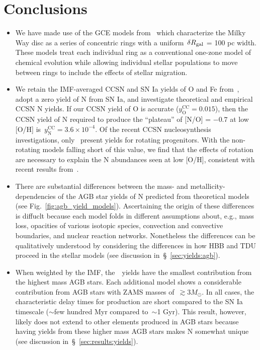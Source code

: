\documentclass[ms.tex]{subfiles}
\begin{document}
 

\section{Conclusions} 
\label{sec:conclusions} 

\begin{itemize} 
	\item We have made use of the GCE models from~\citet{Johnson2021} which 
	characterize the Milky Way disc as a series of concentric rings with a 
	uniform~$\delta R_\text{gal}$ = 100 pc width. 
	These models treat each individual ring as a conventional one-zone model 
	of chemical evolution while allowing individual stellar populations to move 
	between rings to include the effects of stellar migration. 

	\item We retain the IMF-averaged CCSN and SN Ia yields of O and Fe 
	from~\citet{Johnson2021}, adopt a zero yield of N from SN Ia, and 
	investigate theoretical and empirical CCSN N yields. 
	If our CCSN yield of O is accurate ($y_\text{O}^\text{CC} = 0.015$), then 
	the CCSN yield of N required to produce the ``plateau'' of [N/O] = $-0.7$ 
	at low [O/H] is~$y_\text{N}^\text{CC} = 3.6\times10^{-4}$. 
	Of the recent CCSN nucleosynthesis investigations, only~\citet{Limongi2018} 
	present yields for rotating progenitors. 
	With the non-rotating models falling short of this value, we find that the 
	effects of rotation are necessary to explain the N abundances seen at low 
	[O/H], consistent with recent results from~\citet{Grisoni2021}. 

	\item There are substantial differences between the mass- and
	metallicity-dependencies of the AGB star yields of N predicted from
	theoretical models (see Fig.~\ref{fig:agb_yield_models}).
	Ascertaining the origin of these differences is diffuclt because each
	model folds in different assumptions about, e.g., mass loss, opacities of
	various isotopic species, convection and convective boundaries, and nuclear
	reaction networks.
	Nonetheless the differences can be qualitatively understood by considering
	the differences in how HBB and TDU proceed in the stellar models (see
	discussion in~\S~\ref{sec:yields:agb}).

	\item When weighted by the IMF, the~\cristallo~yields have the smallest
	contribution from the highest mass AGB stars.
	Each additional model shows a considerable contribution from AGB stars
	with ZAMS masses of~$\gtrsim 3 M_\odot$.
	In all cases, the characteristic delay times for production are short
	compared to the SN Ia timescale ($\sim$few hundred Myr compared  to~$\sim$1
	Gyr).
	This result, however, likely does not extend to other elements produced in
	AGB stars because having yields from these higher mass AGB stars makes N
	somewhat unique (see discussion in~\S~\ref{sec:results:yields}).


\end{itemize}
\end{document}
